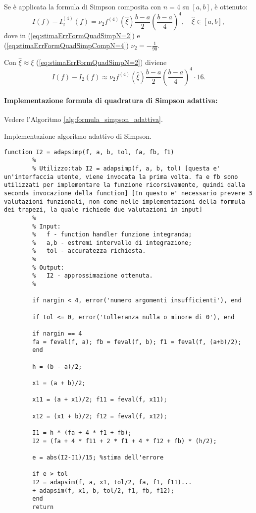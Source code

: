 Se è applicata la formula di Simpson composita con $n=4$ su $[a,b]$, è ottenuto:
\begin{equation}\label{eq:stimaErrFormQuadSimpCompN=4}
    I(f)-I_2^{(4)}(f)=\nu_2 f^{(4)}(\widehat\xi)\frac{b-a}{2}\left(\frac{b-a}{4}\right)^4,\quad \widehat\xi\in[a,b],
\end{equation}
dove in (\ref{eq:stimaErrFormQuadSimpN=2}) e (\ref{eq:stimaErrFormQuadSimpCompN=4}) $\nu_2=-\frac{1}{90}$.

Con $\widehat\xi\approx\xi$ (\ref{eq:stimaErrFormQuadSimpN=2}) diviene
\begin{equation}\label{eq:trasfXiToXi}
    I(f)-I_2(f)\approx\nu_2 f^{(4)}(\widehat\xi)\frac{b-a}{2}\left(\frac{b-a}{4}\right)^4\cdot 16.
\end{equation}

\paragraph{Implementazione formula di quadratura di Simpson adattiva:} Vedere l'Algoritmo \ref{alg:formula_simpson_adattiva}.

\begin{algorithm}\caption{Implementazione algoritmo adattivo di Simpson.}
	\label{alg:formula_simpson_adattiva}
	\begin{lstlisting}[style=Matlab-editor]
		function I2 = adapsimp(f, a, b, tol, fa, fb, f1)
		%
		% Utilizzo:tab I2 = adapsimp(f, a, b, tol) [questa e' un'interfaccia utente, viene invocata la prima volta. fa e fb sono utilizzati per implementare la funzione ricorsivamente, quindi dalla seconda invocazione della function] [In questo e' necessario prevere 3 valutazioni funzionali, non come nelle implementazioni della formula dei trapezi, la quale richiede due valutazioni in input]
		%
		% Input:
		%   f - function handler funzione integranda;
		%   a,b - estremi intervallo di integrazione;
		%   tol - accuratezza richiesta.
		%
		% Output:
		%   I2 - approssimazione ottenuta.
		%
		
		if nargin < 4, error('numero argomenti insufficienti'), end
		
		if tol <= 0, error('tolleranza nulla o minore di 0'), end 
		
		if nargin == 4
		fa = feval(f, a); fb = feval(f, b); f1 = feval(f, (a+b)/2);
		end
		
		h = (b - a)/2;
		
		x1 = (a + b)/2;
		
		x11 = (a + x1)/2; f11 = feval(f, x11);
		
		x12 = (x1 + b)/2; f12 = feval(f, x12);
		
		I1 = h * (fa + 4 * f1 + fb); 
		I2 = (fa + 4 * f11 + 2 * f1 + 4 * f12 + fb) * (h/2);
		
		e = abs(I2-I1)/15; %stima dell'errore
		
		if e > tol
		I2 = adapsim(f, a, x1, tol/2, fa, f1, f11)...
		+ adapsim(f, x1, b, tol/2, f1, fb, f12); 
		end
		return
	\end{lstlisting}
\end{algorithm}

